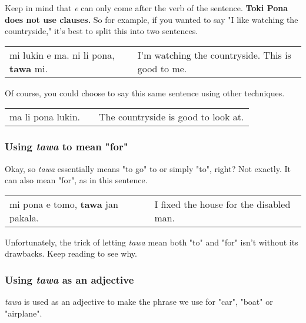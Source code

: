 Keep in mind that \textit{e} can only come after the verb of the sentence. 
\textbf{Toki Pona does not use clauses.} 
So for example, if you wanted to say "I like watching the countryside," it's best to split this into two sentences.

\begin{supertabular}{p{5,5cm}|ll}
mi lukin e ma. ni li pona, \textbf{tawa} mi. && I'm watching the countryside. This is good to me.\\
\end{supertabular} 

Of course, you could choose to say this same sentence using other techniques. 

\begin{supertabular}{p{5,5cm}|ll}
ma li pona lukin. && The countryside is good to look at. \\
\end{supertabular} 

\subsubsection*{Using \textit{tawa} to mean "for"}
%
Okay, so \textit{tawa} essentially means "to go" to or simply "to", right? 
Not exactly. 
It can also mean "for", as in this sentence.
 
\begin{supertabular}{p{5,5cm}|ll}
mi pona e tomo, \textbf{tawa} jan pakala. && I fixed the house for the disabled man. \\
\end{supertabular} 

Unfortunately, the trick of letting \textit{tawa} mean both "to" and "for" isn't without its drawbacks. 
Keep reading to see why. 

\subsubsection*{Using \textit{tawa} as an adjective}
%
\textit{tawa} is used as an adjective to make the phrase we use for "car", "boat" or "airplane".

